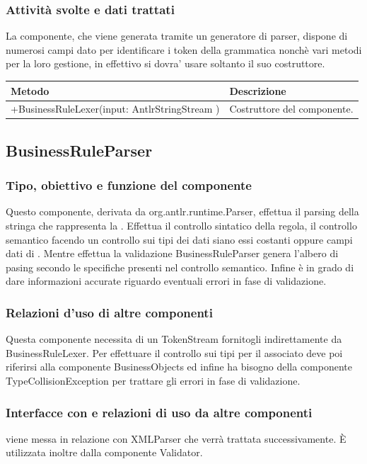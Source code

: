 \documentclass[11pt,titlepage,a4paper]{report}
\begin{document}
\subsubsection{Attivit\`a svolte e dati trattati}
La componente, che viene generata tramite un generatore di parser, dispone di numerosi campi dato per identificare i token della grammatica nonch\`e vari metodi per la loro gestione, in effettivo si dovra' usare soltanto il suo costruttore.
\begin{center}
\begin{tabular}{||p{6cm}||p{6cm}||} \hline
\hline
Metodo & Descrizione \\  \hline
+BusinessRuleLexer(input: AntlrStringStream ) & Costruttore del componente.\\ \hline
\end{tabular}
\end{center}

\subsection{BusinessRuleParser}
\subsubsection{Tipo, obiettivo e funzione del componente}
Questo componente, derivata da org.antlr.runtime.Parser, effettua il parsing della stringa che rappresenta la \br. Effettua il controllo sintatico della regola, il controllo semantico facendo un controllo sui tipi dei dati siano essi costanti oppure campi dati di \bos. Mentre effettua la validazione BusinessRuleParser genera l'albero di pasing secondo le specifiche presenti nel controllo semantico. Infine \`e in grado di dare informazioni accurate 
riguardo eventuali errori in fase di validazione.
\subsubsection{Relazioni d'uso di altre componenti}
Questa componente necessita di un TokenStream fornitogli indirettamente da BusinessRuleLexer. Per effettuare il controllo sui tipi per il \bo associato deve poi riferirsi alla componente BusinessObjects ed infine ha bisogno della componente TypeCollisionException per trattare gli errori in fase di validazione.
\subsubsection{Interfacce con e relazioni di uso da altre componenti}
\brp viene messa in relazione con XMLParser che verr\`a trattata successivamente.
\`E utilizzata inoltre dalla componente Validator.
\end{document}

